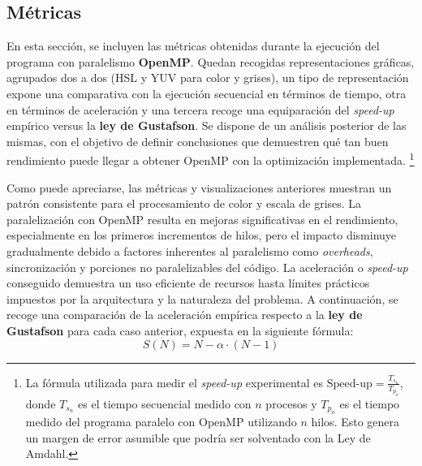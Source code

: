 \subsection{Métricas} \label{Métricas de OpenMP}
En esta sección, se incluyen las métricas obtenidas durante la ejecución del programa con paralelismo \textbf{OpenMP}. 
Quedan recogidas representaciones gráficas, agrupados dos a dos (HSL y YUV para color y grises), un tipo de representación expone una comparativa con la ejecución secuencial en términos de tiempo, otra en términos de aceleración y una tercera recoge una equiparación del \textit{speed-up} empírico versus la \textbf{ley de Gustafson}. 
Se dispone de un análisis posterior de las mismas, con el objetivo de definir conclusiones que demuestren qué tan buen rendimiento puede llegar a obtener OpenMP con la optimización implementada.
\footnote{\label{note:speedup}La fórmula utilizada para medir el \textit{speed-up} experimental es 
$\text{Speed-up} = \frac{T_{s_n}}{T_{p_n}}$, donde $T_{s_n}$ es el tiempo secuencial medido con $n$ procesos y $T_{p_n}$ es el tiempo medido del programa paralelo con OpenMP utilizando $n$ hilos. Esto genera un margen de error asumible que podría ser solventado con la Ley de Amdahl.}


\newpage
{}

Como puede apreciarse, las métricas y visualizaciones anteriores muestran un patrón consistente para el procesamiento de color y escala de grises. 
La paralelización con OpenMP resulta en mejoras significativas en el rendimiento, especialmente en los primeros incrementos de hilos, pero el impacto disminuye gradualmente debido a factores inherentes al paralelismo como \textit{overheads}, sincronización y porciones no paralelizables del código. 
La aceleración o \textit{speed-up} conseguido demuestra un uso eficiente de recursos hasta límites prácticos impuestos por la arquitectura y la naturaleza del problema.
\newpage
A continuación, se recoge una comparación de la aceleración empírica respecto a la \textbf{ley de Gustafson} para cada caso anterior, expuesta en la siguiente fórmula:
\[
S(N) = N - \alpha \cdot (N - 1)
\]

